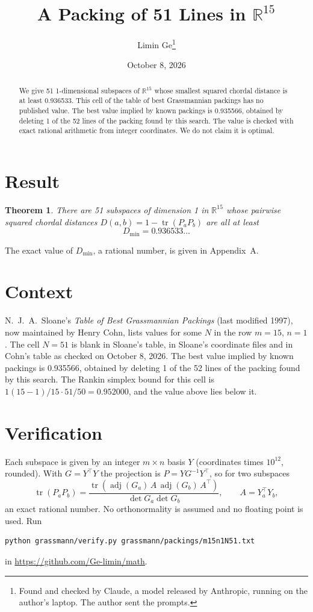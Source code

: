 \documentclass[11pt,a4paper]{article}
\title{A Packing of 51 Lines in $\mathbb{R}^{15}$}
\author{Limin Ge\thanks{Found and checked by Claude, a model released by Anthropic, running on the author's laptop. The author sent the prompts.}}
\date{October 8, 2026}
\newtheorem*{theorem}{Theorem}
\begin{document}
\maketitle
\begin{abstract}
We give 51 1-dimensional subspaces of $\mathbb{R}^{15}$ whose smallest squared chordal distance is at least 0.936533. This cell of the table of best Grassmannian packings has no published value. The best value implied by known packings is 0.935566, obtained by deleting 1 of the 52 lines of the packing found by this search. The value is checked with exact rational arithmetic from integer coordinates. We do not claim it is optimal.
\end{abstract}

\section{Result}
\begin{theorem}
There are 51 subspaces of dimension 1 in $\mathbb{R}^{15}$ whose pairwise squared chordal distances $D(a,b) = 1 - \operatorname{tr}(P_aP_b)$ are all at least
\[ D_{\min} = 0.936533\ldots \]
\end{theorem}
The exact value of $D_{\min}$, a rational number, is given in Appendix~A.


\section{Context}
N.~J.~A.~Sloane's \emph{Table of Best Grassmannian Packings} (last modified 1997), now maintained by Henry Cohn, lists values for some $N$ in the row $m=15$, $n=1$. The cell $N=51$ is blank in Sloane's table, in Sloane's coordinate files and in Cohn's table as checked on October 8, 2026. The best value implied by known packings is 0.935566, obtained by deleting 1 of the 52 lines of the packing found by this search. The Rankin simplex bound for this cell is $1(15-1)/15\cdot 51/50 = 0.952000$, and the value above lies below it.


\section{Verification}
Each subspace is given by an integer $m\times n$ basis $Y$ (coordinates times $10^{12}$, rounded). With $G=Y^\top Y$ the projection is $P=YG^{-1}Y^\top$, so for two subspaces
\[ \operatorname{tr}(P_aP_b)=\frac{\operatorname{tr}(\operatorname{adj}(G_a)\,A\,\operatorname{adj}(G_b)\,A^\top)}{\det G_a\det G_b},\qquad A=Y_a^\top Y_b, \]
an exact rational number. No orthonormality is assumed and no floating point is used. Run
\begin{verbatim}
python grassmann/verify.py grassmann/packings/m15n1N51.txt
\end{verbatim}
in \url{https://github.com/Ge-limin/math}.
\end{document}
